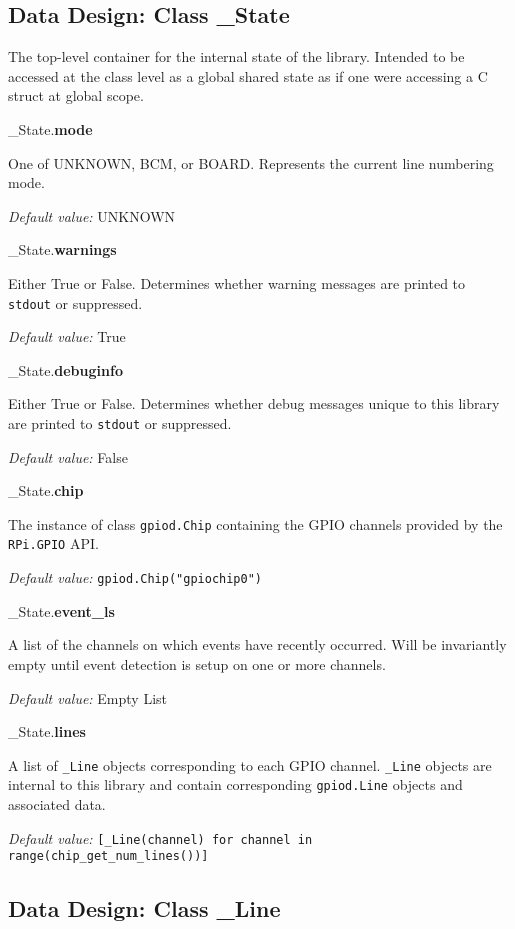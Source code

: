 \documentclass[12pt]{article}
\begin{document}
\subsection{Data Design: Class \_State} \label{class_state}

The top-level container for the internal state of the library. Intended to be accessed at the class level as a global shared state as if one were accessing a C struct at global scope. 

\medskip

\noindent \_State.\textbf{mode}

One of UNKNOWN, BCM, or BOARD. Represents the current line numbering mode.

\textit{Default value:} UNKNOWN

\noindent \_State.\textbf{warnings}

Either True or False. Determines whether warning messages are printed to \texttt{stdout} or suppressed.

\textit{Default value:} True

\noindent \_State.\textbf{debuginfo}

Either True or False. Determines whether debug messages unique to this library are printed to \texttt{stdout} or suppressed.

\textit{Default value:} False

\noindent \_State.\textbf{chip}

The instance of class \texttt{gpiod.Chip} containing the GPIO channels provided by the \texttt{RPi.GPIO} API.

\textit{Default value:} \texttt{gpiod.Chip("gpiochip0")}

\noindent \_State.\textbf{event\_ls}

A list of the channels on which events have recently occurred. Will be invariantly empty until event detection is setup on one or more channels.

\textit{Default value:} Empty List

\noindent \_State.\textbf{lines}

A list of \texttt{\_Line} objects corresponding to each GPIO channel. \texttt{\_Line} objects are internal to this library and contain corresponding \texttt{gpiod.Line} objects and associated data.

\textit{Default value:} \texttt{[\_Line(channel) for channel in range(chip\_get\_num\_lines())]}

\subsection{Data Design: Class \_Line}
\end{document}

